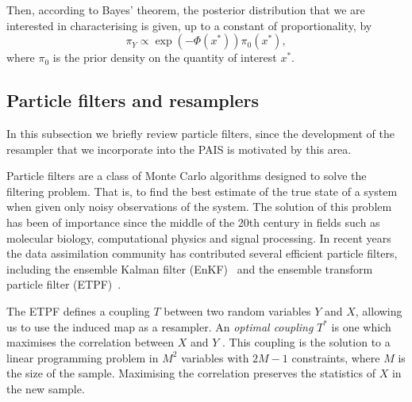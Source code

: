\documentclass[final]{siamltex}
\begin{document}
Then, according to Bayes' theorem, the posterior distribution that we
are interested in characterising is given, up to a constant of proportionality, by
\begin{equation*}
	\pi_Y \propto \exp \left ( -\Phi(x^*) \right )\pi_0(x^*),
\end{equation*}
where $\pi_0$ is the prior density on the quantity of interest $x^*$.



\subsection{Particle filters and resamplers}\label{sec:filters}
In this subsection we briefly review particle filters, since the
development of the resampler that we incorporate into the PAIS is
motivated by this area.

Particle filters are a class of Monte Carlo algorithms designed to
solve the filtering problem. That is, to find the best estimate of the
true state of a system when given only noisy observations of the
system. The solution of this problem has been of importance since the
middle of the 20th century in fields such as molecular biology,
computational physics and signal processing. In recent years the data
assimilation community has contributed several efficient particle
filters, including the ensemble Kalman filter
(EnKF)~\cite{evensen1994sequential} and the ensemble transform
particle filter (ETPF)~\cite{reich2013nonparametric}.

The ETPF defines a coupling $T$ between two random variables $Y$ and
$X$, allowing us to use the induced map as a resampler. An \emph{optimal
coupling} $T^*$ is one which maximises the correlation between $X$ and
$Y$ \cite{cotter2012ensemble}. This coupling is the solution to a
linear programming problem in $M^2$ variables with $2M-1$ constraints,
where $M$ is the size of the sample. Maximising the correlation
preserves the statistics of $X$ in the new sample.
\end{document}
